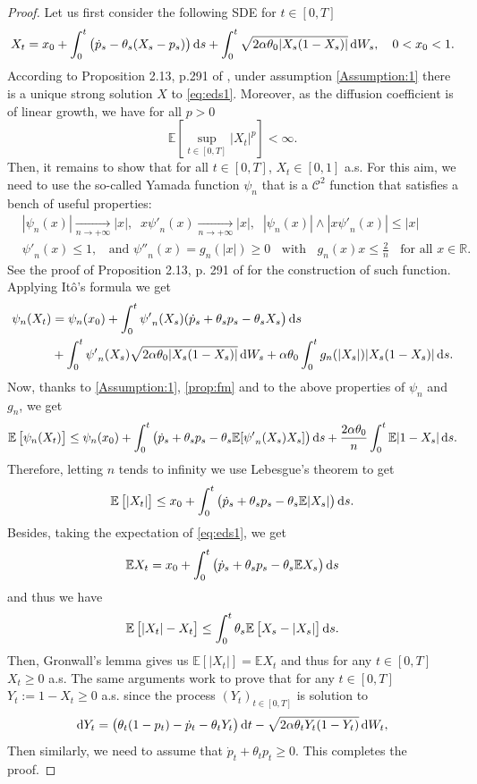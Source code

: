 \documentclass[11pt]{article}
\theoremstyle{definition}
\begin{document}
\begin{proof}
Let us first consider the following SDE for $t\in[0,T]$
\begin{equation}\label{eq:eds1}
X_t=x_0+  \int_0^t\big(\dot p_s - \theta_s(X_s-p_s)  \big)\dif s  + \int_0^t\sqrt{2\alpha \theta_0 |X_s(1-X_s)|} \dif W_s, \quad 0<x_0<1.
\end{equation}
According to Proposition 2.13, p.291 of \cite{KarShr}, under assumption  \eqref{Assumption:1} there is a unique strong solution $X$ to \eqref{eq:eds1}. Moreover, as the diffusion coefficient is of linear growth, we have  for all $p>0$ 
\begin{equation}\label{prop:fm}
\mathbb E\left[ \sup_{t\in[0,T]}|X_t|^p\right]<\infty.
\end{equation}
Then, it remains to show that for all $t\in[0,T]$, $X_t\in[0,1]$ a.s. For this aim, we need to use the so-called Yamada function $\psi_n$ that is a $\mathcal C^2$ function that satisfies a bench of useful properties:
\begin{align*}
&|\psi_n(x)|\underset{n\rightarrow+\infty}{\rightarrow}|x|, \;\; x{\psi'}_n(x)\underset{n\rightarrow+\infty}{\rightarrow}|x|, \;\; |\psi_n(x)|\wedge |x{\psi'}_n(x)| \le |x|\\
&{\psi'}_n(x)\le 1, \;\; \mbox{ and } {\psi''}_n(x)=g_n(|x|)\ge 0\;\; \mbox{ with } \;\; g_n(x)x\le \frac 2n\;\;  \mbox{ for all } x\in \mathbb R .
\end{align*}
See the proof of Proposition 2.13, p. 291 of \cite{KarShr} for the construction of such function.
Applying Itô's formula we get
\begin{align*}
\psi_n(X_t)&=\psi_n(x_0) +\int_0^t {\psi'}_n(X_s)(\dot p_s + \theta_s p_s - \theta_sX_s  \big)\dif s \\
&+ \int_0^t{\psi'}_n(X_s)\sqrt{2\alpha \theta_0 |X_s(1-X_s)|} \dif W_s + \alpha \theta_0 \int_0^t  g_n(|X_s|) |X_s(1-X_s)|\dif s.
\end{align*}
Now, thanks to  \eqref{Assumption:1}, \eqref{prop:fm} and to the above properties of $\psi_n$ and $g_n$, we get
$$
\mathbb E\left[\psi_n(X_t)\right]\le \psi_n(x_0) +\int_0^t \left(\dot p_s + \theta_sp_s -  \theta_s \mathbb E[{\psi'}_n(X_s)X_s] \right)\dif s + \frac{2\alpha  \theta_0}{n}\int_0^t \mathbb E |1-X_s|\dif s.
$$
Therefore, letting $n$ tends to infinity we use Lebesgue's theorem to get
$$
\mathbb E\left[|X_t|\right]\le x_0 +\int_0^t \left(\dot p_s + \theta_sp_s -  \theta_s \mathbb E|X_s| \right)\dif s.
$$
Besides, taking the expectation of \eqref{eq:eds1}, we get
$$
\mathbb E X_t=x_0+  \int_0^t\big(\dot p_s +\theta_sp_s - \theta_s \mathbb EX_s  \big)\dif s
$$
and thus we have 
$$
\mathbb E\left[|X_t| -X_t \right]\le \int_0^t \theta_s \mathbb E\left[ X_s - |X_s| \right]\dif s.
$$
Then, Gronwall's lemma gives us $\mathbb E[|X_t|]=\mathbb E X_t$ and thus for any $t\in[0,T]$ $X_t\ge0$ a.s. The same arguments work to prove that  for any $t\in[0,T]$ $Y_t:=1-X_t\ge0$  a.s.  since the process $(Y_t)_{t\in[0,T]}$ is solution to 
$$
\dif Y_t= \big( \theta_t(1-p_t) -\dot p_t - \theta_tY_t  \big)\dif t  -\sqrt{2\alpha \theta_tY_t(1-Y_t)} \dif W_t,
$$
Then similarly, we need to assume that $\dot p_t +\theta_tp_t\ge 0$. This completes the proof.
\end{proof}
\end{document}
